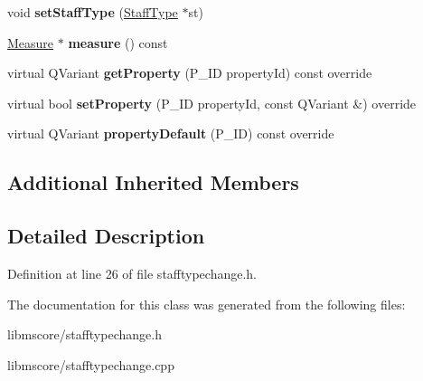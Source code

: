 \begin{DoxyCompactItemize}
\item 
\mbox{\label{class_ms_1_1_staff_type_change_a0245f8243b8bb050e4fee7fa569855e0}} 
void {\bfseries set\+Staff\+Type} (\hyperlink{class_ms_1_1_staff_type}{Staff\+Type} $\ast$st)
\item 
\mbox{\label{class_ms_1_1_staff_type_change_ad9c4d5dbea01d73c6101a43e9f5fe990}} 
\hyperlink{class_ms_1_1_measure}{Measure} $\ast$ {\bfseries measure} () const
\item 
\mbox{\label{class_ms_1_1_staff_type_change_ae9c24d79693eb1b83168c7a31ea51e9a}} 
virtual Q\+Variant {\bfseries get\+Property} (P\+\_\+\+ID property\+Id) const override
\item 
\mbox{\label{class_ms_1_1_staff_type_change_a7d6611a85afb7a0ab1e7781742c29356}} 
virtual bool {\bfseries set\+Property} (P\+\_\+\+ID property\+Id, const Q\+Variant \&) override
\item 
\mbox{\label{class_ms_1_1_staff_type_change_a3cc300081c4adc70d06aec7da6d76dd6}} 
virtual Q\+Variant {\bfseries property\+Default} (P\+\_\+\+ID) const override
\end{DoxyCompactItemize}
\subsection*{Additional Inherited Members}


\subsection{Detailed Description}


Definition at line 26 of file stafftypechange.\+h.



The documentation for this class was generated from the following files\+:\begin{DoxyCompactItemize}
\item 
libmscore/stafftypechange.\+h\item 
libmscore/stafftypechange.\+cpp\end{DoxyCompactItemize}
